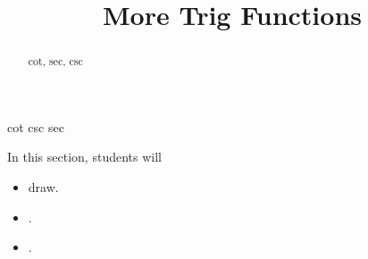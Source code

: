 \documentclass{ximera}
\title{More Trig Functions}
\begin{document}
\begin{abstract}
cot, sec, csc
\end{abstract}
\maketitle



cot csc sec

\begin{sectionOutcomes}
In this section, students will 

\begin{itemize}
\item draw.
\item .
\item .
\end{itemize}
\end{sectionOutcomes}
\end{document}
